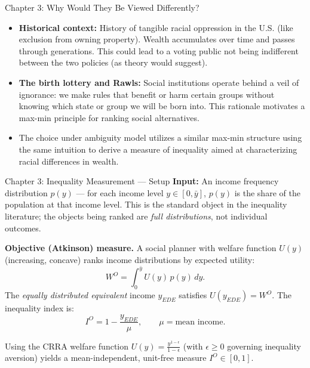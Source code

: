 \documentclass{beamer}
\begin{document}
\begin{frame}{Chapter 3: Why Would They Be Viewed Differently?}
  \scriptsize
  {\setlength{\itemsep}{0.8em}
  \begin{itemize}
    \item \textbf{Historical context:} History of tangible racial oppression in the U.S. (like exclusion from owning property). Wealth accumulates over time and passes through generations. This could lead to a voting public not being indifferent between the two policies (as theory would suggest).
    \vspace{0.6em}
    \item \textbf{The birth lottery and Rawls:} Social institutions operate behind a veil of ignorance: we make rules that benefit or harm certain groups without knowing which state or group we will be born into. This  rationale motivates a max-min principle for ranking social alternatives.
    \vspace{0.6em}
    \item The choice under ambiguity model utilizes a similar max-min structure using the same intuition to derive a measure of inequality aimed at characterizing racial differences in wealth.
  \end{itemize}}
\end{frame}

\begin{frame}[label=ch3-setup]{Chapter 3: Inequality Measurement --- Setup}
  \scriptsize
  \textbf{Input:} An income frequency distribution $p(y)$ --- for each income level $y \in [0,\bar{y}]$, $p(y)$ is the share of the population at that income level. This is the standard object in the inequality literature; the objects being ranked are \textit{full distributions}, not individual outcomes.

  \vspace{0.5em}
  \textbf{Objective (Atkinson) measure.} A social planner with welfare function $U(y)$ (increasing, concave) ranks income distributions by expected utility:
  $$W^O = \int_0^{\bar{y}} U(y)\, p(y)\, dy.$$
  The \textit{equally distributed equivalent} income $y_{EDE}$ satisfies $U(y_{EDE}) = W^O$. The inequality index is:
  $$I^O = 1 - \frac{y_{EDE}}{\mu}, \qquad \mu = \text{mean income.}$$

  \vspace{0.2em}
  Using the CRRA welfare function $U(y) = \frac{y^{1-\epsilon}}{1-\epsilon}$ (with $\epsilon \geq 0$ governing inequality aversion) yields a mean-independent, unit-free measure $I^O \in [0,1]$.
\end{frame}
\end{document}
